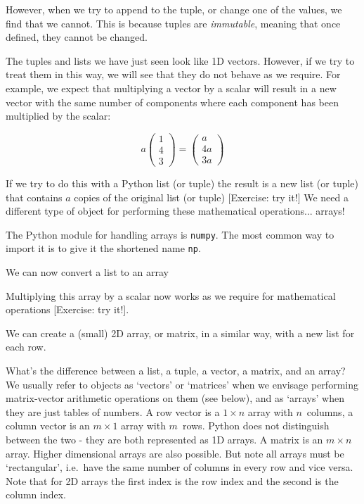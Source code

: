 However, when we try to append to the tuple, or change one of the
values, we find that we cannot. This is because tuples are
\textit{immutable}, meaning that once defined, they cannot be changed.


The tuples and lists we have just seen look like 1D vectors. However,
if we try to treat them in this way, we will see that they do not
behave as we require. For example, we expect that multiplying a vector
by a scalar will result in a new vector with the same number of
components where each component has been multiplied by the scalar:

\begin{equation}
  a\begin{pmatrix}
  1 \\
  4 \\
  3
  \end{pmatrix}
  = \begin{pmatrix}
  a \\
  4a \\
  3a
  \end{pmatrix}
\end{equation}

If we try to do this with a Python list (or tuple) the result is a new
list (or tuple) that contains $a$ copies of the original list (or
tuple) [Exercise: try it!] We need a different type of object for
performing these mathematical operations... arrays!

The Python module for handling arrays is \texttt{numpy}. The most
common way to import it is to give it the shortened name \texttt{np}.


We can now convert a list to an array


Multiplying this array by a scalar now works as we require for
mathematical operations [Exercise: try it!].

We can create a (small) 2D array, or matrix, in a similar way, with a
new list for each row.


What's the difference between a list, a tuple, a vector, a matrix, and
an array? We usually refer to objects as `vectors' or `matrices' when
we envisage performing matrix-vector arithmetic operations on them
(see below), and as `arrays' when they are just tables of numbers. A
row vector is a $1 \times n$ array with $n$~columns, a column vector
is an $m \times 1$ array with $m$~rows. Python does not distinguish
between the two - they are both represented as 1D arrays. A matrix is
an $m \times n$ array.  Higher dimensional arrays are also
possible. But note all arrays must be `rectangular', i.e.\ have the
same number of columns in every row and vice versa. Note that for 2D
arrays the first index is the row index and the second is the column
index.

